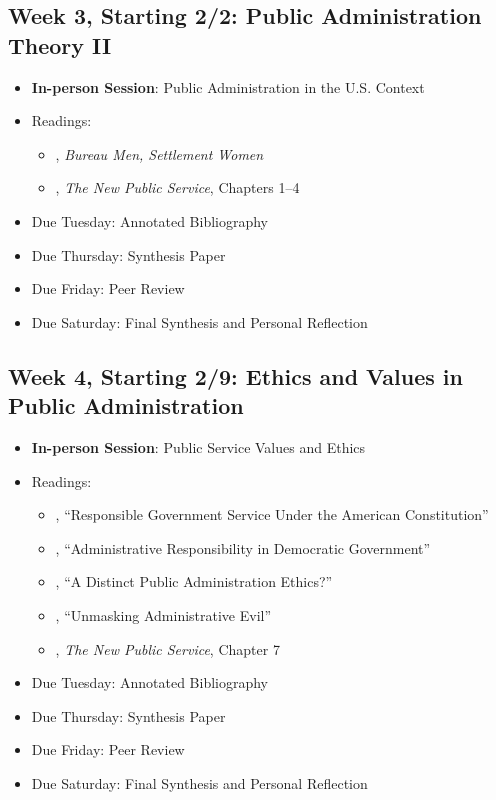 \documentclass[12pt, letterpaper]{article}
\begin{document}
\subsection*{Week 3, Starting 2/2: Public Administration Theory II}
\begin{itemize}
    \item \textbf{In-person Session}: Public Administration in the U.S. Context
    \item Readings:
        \begin{itemize}
            \item \citet{Stivers2000}, \emph{Bureau Men, Settlement Women} 
            \item \citet{Denhardt2015}, \emph{The New Public Service}, Chapters 1--4 
        \end{itemize}
    \item Due Tuesday: Annotated Bibliography
    \item Due Thursday: Synthesis Paper
    \item Due Friday: Peer Review
    \item Due Saturday: Final Synthesis and Personal Reflection
\end{itemize}

\subsection*{Week 4, Starting 2/9: Ethics and Values in Public Administration}
\begin{itemize}
    \item \textbf{In-person Session}: Public Service Values and Ethics
    \item Readings:
        \begin{itemize}
            \item \citet{friedrich1935}, ``Responsible Government Service Under the American Constitution'' 
            \item \citet{FINER1941}, ``Administrative Responsibility in Democratic Government'' 
            \item \citet{goss1996}, ``A Distinct Public Administration Ethics?'' 
            \item \citet{Adams2009}, ``Unmasking Administrative Evil'' 
            \item \citet{Denhardt2015}, \emph{The New Public Service}, Chapter 7 
        \end{itemize}
    \item Due Tuesday: Annotated Bibliography
    \item Due Thursday: Synthesis Paper
    \item Due Friday: Peer Review
    \item Due Saturday: Final Synthesis and Personal Reflection
\end{itemize}
\end{document}
